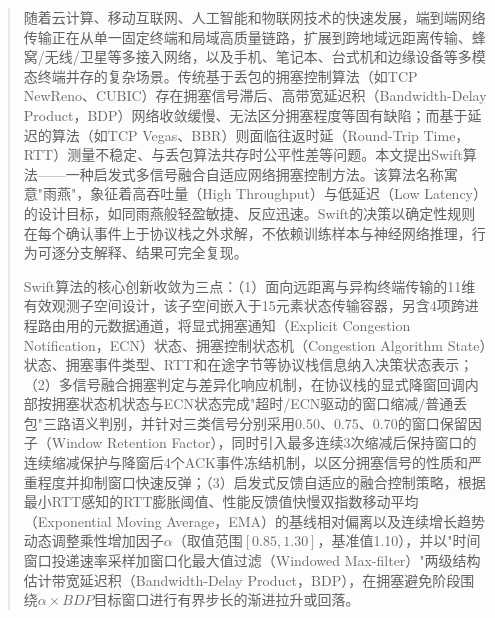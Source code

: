 \begin{abstract}
随着云计算、移动互联网、人工智能和物联网技术的快速发展，端到端网络传输正在从单一固定终端和局域高质量链路，扩展到跨地域远距离传输、蜂窝/无线/卫星等多接入网络，以及手机、笔记本、台式机和边缘设备等多模态终端并存的复杂场景。传统基于丢包的拥塞控制算法（如TCP NewReno、CUBIC）存在拥塞信号滞后、高带宽延迟积（Bandwidth-Delay Product，BDP）网络收敛缓慢、无法区分拥塞程度等固有缺陷；而基于延迟的算法（如TCP Vegas、BBR）则面临往返时延（Round-Trip Time，RTT）测量不稳定、与丢包算法共存时公平性差等问题。本文提出Swift算法——一种启发式多信号融合自适应网络拥塞控制方法。该算法名称寓意"雨燕"，象征着高吞吐量（High Throughput）与低延迟（Low Latency）的设计目标，如同雨燕般轻盈敏捷、反应迅速。Swift的决策以确定性规则在每个确认事件上于协议栈之外求解，不依赖训练样本与神经网络推理，行为可逐分支解释、结果可完全复现。

Swift算法的核心创新收敛为三点：（1）面向远距离与异构终端传输的11维有效观测子空间设计，该子空间嵌入于15元素状态传输容器，另含4项跨进程路由用的元数据通道，将显式拥塞通知（Explicit Congestion Notification，ECN）状态、拥塞控制状态机（Congestion Algorithm State）状态、拥塞事件类型、RTT和在途字节等协议栈信息纳入决策状态表示；（2）多信号融合拥塞判定与差异化响应机制，在协议栈的显式降窗回调内部按拥塞状态机状态与ECN状态完成"超时/ECN驱动的窗口缩减/普通丢包"三路语义判别，并针对三类信号分别采用0.50、0.75、0.70的窗口保留因子（Window Retention Factor），同时引入最多连续3次缩减后保持窗口的连续缩减保护与降窗后4个ACK事件冻结机制，以区分拥塞信号的性质和严重程度并抑制窗口快速反弹；（3）启发式反馈自适应的融合控制策略，根据最小RTT感知的RTT膨胀阈值、性能反馈值快慢双指数移动平均（Exponential Moving Average，EMA）的基线相对偏离以及连续增长趋势动态调整乘性增加因子$\alpha$（取值范围$[0.85, 1.30]$，基准值1.10），并以"时间窗口投递速率采样加窗口化最大值过滤（Windowed Max-filter）"两级结构估计带宽延迟积（Bandwidth-Delay Product，BDP），在拥塞避免阶段围绕$\alpha \times BDP$目标窗口进行有界步长的渐进拉升或回落。


\end{abstract}
